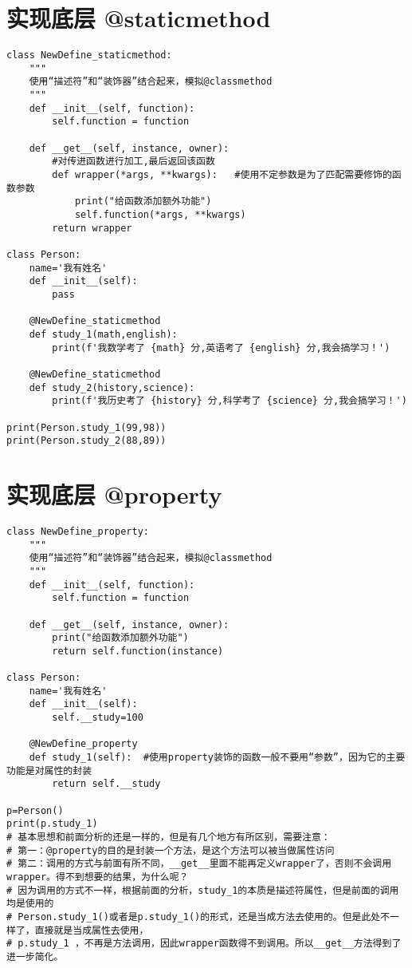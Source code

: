 \documentclass[11pt]{article}
\begin{document}
\section{实现底层 @staticmethod}
\label{sec:org60b2b44}
\begin{verbatim}
class NewDefine_staticmethod:
    """
    使用“描述符”和“装饰器”结合起来，模拟@classmethod
    """
    def __init__(self, function):
        self.function = function

    def __get__(self, instance, owner):
        #对传进函数进行加工,最后返回该函数
        def wrapper(*args, **kwargs):   #使用不定参数是为了匹配需要修饰的函数参数
            print("给函数添加额外功能")
            self.function(*args, **kwargs)
        return wrapper

class Person:
    name='我有姓名'
    def __init__(self):
        pass

    @NewDefine_staticmethod
    def study_1(math,english):
        print(f'我数学考了 {math} 分,英语考了 {english} 分,我会搞学习！')

    @NewDefine_staticmethod
    def study_2(history,science):
        print(f'我历史考了 {history} 分,科学考了 {science} 分,我会搞学习！')

print(Person.study_1(99,98))
print(Person.study_2(88,89))
\end{verbatim}
\section{实现底层 @property}
\label{sec:org034431f}
\begin{verbatim}
class NewDefine_property:
    """
    使用“描述符”和“装饰器”结合起来，模拟@classmethod
    """
    def __init__(self, function):
        self.function = function

    def __get__(self, instance, owner):
        print("给函数添加额外功能")
        return self.function(instance)

class Person:
    name='我有姓名'
    def __init__(self):
        self.__study=100

    @NewDefine_property
    def study_1(self):  #使用property装饰的函数一般不要用“参数”，因为它的主要功能是对属性的封装
        return self.__study

p=Person()
print(p.study_1)
# 基本思想和前面分析的还是一样的，但是有几个地方有所区别，需要注意：
# 第一：@property的目的是封装一个方法，是这个方法可以被当做属性访问
# 第二：调用的方式与前面有所不同，__get__里面不能再定义wrapper了，否则不会调用wrapper。得不到想要的结果，为什么呢？
# 因为调用的方式不一样，根据前面的分析，study_1的本质是描述符属性，但是前面的调用均是使用的
# Person.study_1()或者是p.study_1()的形式，还是当成方法去使用的。但是此处不一样了，直接就是当成属性去使用，
# p.study_1 ，不再是方法调用，因此wrapper函数得不到调用。所以__get__方法得到了进一步简化。
\end{verbatim}
\end{document}
